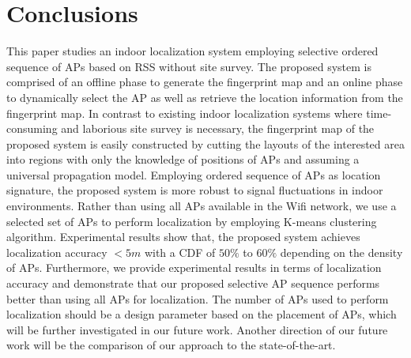 \documentclass[10pt, conference, letterpaper]{IEEEtran}
\begin{document}
\vspace{-0.1in}
\section{Conclusions}
\label{section:conclusion}
This paper studies an indoor localization system employing selective ordered sequence of APs based on RSS without site survey. 
The proposed system is comprised of an offline phase to generate the fingerprint map and an online phase to dynamically select the AP as well as retrieve the location information from the fingerprint map. 
In contrast to existing indoor localization systems where time-consuming and laborious site survey is necessary, 
the fingerprint map of the proposed system is easily constructed by cutting the layouts of the interested area into regions with only the knowledge of positions of APs 
and assuming a universal propagation model. 
Employing ordered sequence of APs as location signature, the proposed system is more robust to signal fluctuations in indoor environments. 
Rather than using all APs available in the Wifi network, we use a selected set of APs to perform localization by employing K-means clustering algorithm. 
Experimental results show that, the proposed system achieves localization accuracy $<5m$ with a CDF of $50\%$ to $60\%$ depending on the density of APs. 
Furthermore, we provide experimental results in terms of localization accuracy and demonstrate that our proposed selective AP sequence performs better than using all APs for localization. 
The number of APs used to perform localization should be a design parameter based on the placement of APs, which will be further investigated in our future work. 
Another direction of our future work will be the comparison of our approach to the state-of-the-art.


\vspace{-0.1in}
\end{document}
